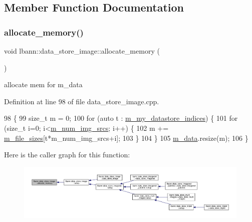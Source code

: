 \subsection{Member Function Documentation}
\mbox{\label{classlbann_1_1data__store__image_af74877e493b5a822dd3d3793a95ceb9d}} 
\subsubsection{\texorpdfstring{allocate\+\_\+memory()}{allocate\_memory()}}
{\footnotesize\ttfamily void lbann\+::data\+\_\+store\+\_\+image\+::allocate\+\_\+memory (\begin{DoxyParamCaption}{ }\end{DoxyParamCaption})\hspace{0.3cm}{\ttfamily [protected]}}



allocate mem for m\+\_\+data 



Definition at line 98 of file data\+\_\+store\+\_\+image.\+cpp.


\begin{DoxyCode}
98                                        \{
99   \textcolor{keywordtype}{size\_t} m = 0;
100   \textcolor{keywordflow}{for} (\textcolor{keyword}{auto} t : \hyperlink{classlbann_1_1generic__data__store_abd38f8d8aab0648959e09d011abfe20a}{m\_my\_datastore\_indices}) \{
101     \textcolor{keywordflow}{for} (\textcolor{keywordtype}{size\_t} i=0; i<\hyperlink{classlbann_1_1data__store__image_a2f660053e7621a9cc70a7c4eef53c9cc}{m\_num\_img\_srcs}; i++) \{
102       m += \hyperlink{classlbann_1_1data__store__image_a1903176a4b305fd42617ea1cb6d997ae}{m\_file\_sizes}[t*m\_num\_img\_srcs+i];
103     \}    
104   \}    
105   \hyperlink{classlbann_1_1data__store__image_a10e9aa0c240785bc0a961f24e87a1c16}{m\_data}.resize(m);
106 \}
\end{DoxyCode}
Here is the caller graph for this function\+:\nopagebreak
\begin{figure}[H]
\begin{center}
\leavevmode
\includegraphics[width=350pt]{classlbann_1_1data__store__image_af74877e493b5a822dd3d3793a95ceb9d_icgraph}
\end{center}
\end{figure}
\mbox{\label{classlbann_1_1data__store__image_ab62efcb2dbe3118bf2815fa5d51fee61}} 
